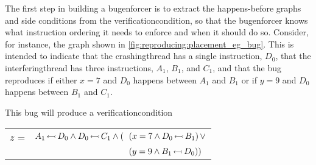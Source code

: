 \begin{wrapfigure}{o}{5.2cm}
  \vspace{-12pt}
  \begin{figgure}
  \caption{}
  \label{fig:reproducing:placement_eg_bug}
  \end{figgure}
  \vspace{-12pt}
\end{wrapfigure}
\noindent The first step in building a \gls{bugenforcer} is to extract
the happens-before graphs and \glspl{side condition} from the
\gls{verificationcondition}, so that the \gls{bugenforcer} knows what
instruction ordering it needs to enforce and when it should do so.
Consider, for instance, the graph shown in
\autoref{fig:reproducing:placement_eg_bug}.  This is intended to
indicate that the \gls{crashingthread} has a single instruction,
$D_0$, that the \gls{interferingthread} has three instructions, $A_1$,
$B_1$, and $C_1$, and that the bug reproduces if either $x = 7$ and
$D_0$ happens between $A_1$ and $B_1$ or if $y = 9$ and $D_0$ happens
between $B_1$ and $C_1$.

This bug will produce a \gls{verificationcondition}

\noindent
{\hfill}
\begin{tabular}{lll}
$z$ = & $A_1\,{\leftarrowtail}\,D_0 \wedge D_0\,{\leftarrowtail}\,C_1 \wedge (\!\!\!\!$ & $(x = 7 \wedge D_0\,{\leftarrowtail}\,B_1)\,\vee$ \\
      &                                                                            & $(y = 9 \wedge B_1\,{\leftarrowtail}\,D_0))$
\end{tabular}
{\hfill}

